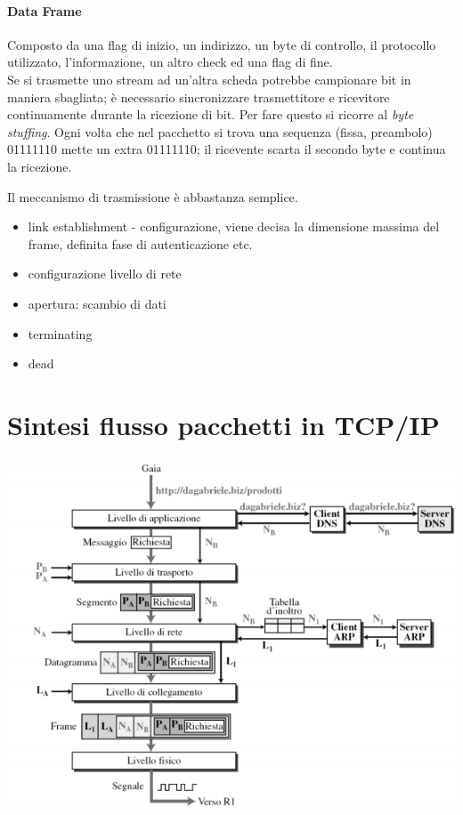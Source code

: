 \paragraph{Data Frame} Composto da una flag di inizio, un indirizzo, un byte di controllo, il protocollo utilizzato, l'informazione, un altro check ed una flag di fine.\\
Se si trasmette uno stream ad un'altra scheda potrebbe campionare bit in maniera sbagliata; è necessario sincronizzare trasmettitore e ricevitore continuamente durante la ricezione di bit. Per fare questo si ricorre al \textit{byte stuffing}.
Ogni volta che nel pacchetto si trova una sequenza (fissa, preambolo) 01111110 mette un extra 01111110; il ricevente scarta il secondo byte e continua la ricezione.

Il meccanismo di trasmissione è abbastanza semplice.
\begin{itemize}
	\item link establishment - configurazione, viene decisa la dimensione massima del frame, definita fase di autenticazione etc.
	\item configurazione livello di rete
	\item apertura: scambio di dati
	\item terminating
	\item dead
\end{itemize}

\section{Sintesi flusso pacchetti in TCP/IP}
\begin{center}
	\includegraphics[width=.7\textwidth]{res/flusso-pacchetti-tcpip.png} \hfill
\end{center}

